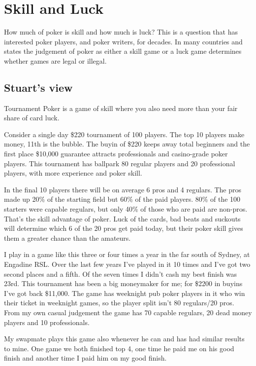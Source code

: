 \chapter{Skill and Luck}

How much of poker is skill and how much is luck? This is a question
that has interested poker players, and poker writers, for decades.
In many countries and states the judgement of poker as either a
skill game or a luck game determines whether games are legal or
illegal.

\section{Stuart's view}

Tournament Poker is a game of skill where you also need more than your
fair share of card luck.

Consider a single day \$220 tournament of 100 players. The top 10
players make money, 11th is the bubble. The buyin of
\$220 keeps away total beginners and the first place \$10,000
guarantee attracts professionals and casino-grade poker players.
This tournament has ballpark 80 regular players and 20 professional
players, with more experience and poker skill.

In the final 10 players there will be on average 6 pros and 4
regulars. The pros made up 20\% of the starting field but 60\% of
the paid players. 80\% of the 100 starters were capable regulars, but
only 40\% of those who are paid are non-pros. That's the skill
advantage of poker. Luck of the cards, bad beats and suckouts will
determine which 6 of the 20 pros get paid today, but their poker skill
gives them a greater chance than the amateurs.

I play in a game like this three or four times a year in the far
south of Sydney, at Engadine RSL. Over the last few years I've played
in it 10 times and I've got two second places and a fifth. Of the
seven times I didn't cash my best finish was 23rd. This tournament has
been a big moneymaker for me; for \$2200 in buyins I've got back
\$11,000. The game has weeknight pub poker players in it who win their
ticket in weeknight games, so the player split isn't 80 regulars/20 pros.
From my own casual judgement the game has 70 capable regulars, 20 dead
money players and 10 professionals.

My swapmate plays this game also whenever he can and has had similar
results to mine. One game we both finished top 4, one time he paid
me on his good finish and another time I paid him on my good finish.

